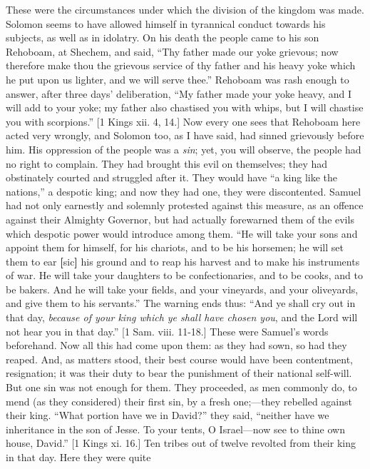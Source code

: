 These were the circumstances under which the division of the
kingdom was made. Solomon seems to have allowed himself in tyrannical
conduct towards his subjects, as well as in idolatry. On his death the
people came to his son Rehoboam, at Shechem, and said, ``Thy
father made our yoke grievous; now therefore make thou the grievous
service of thy father and his heavy yoke which he put upon us lighter,
and we will serve thee.'' Rehoboam was rash enough to answer,
after three days' deliberation, ``My father made your yoke
heavy, and I will add to your yoke; my father also chastised you with
whips, but I will chastise you with scorpions.'' [1 Kings xii. 4,
14.] Now every one sees that Rehoboam here acted very wrongly, and
Solomon too, as I have said, had sinned grievously before him. His
oppression of the people was a \emph{sin}; yet, you will observe, the
people had no right to complain. They had brought this evil on
themselves; they had obstinately courted and struggled after it. They
would have ``a king like the nations,'' a despotic king; and
now they had one, they were discontented. Samuel had not only
earnestly and solemnly protested against this measure, as an offence
against their Almighty Governor, but had actually forewarned them of
the evils which despotic power would introduce among them. ``He
will take your sons and appoint them for himself, for his chariots,
and to be his horsemen; he will set them to ear \textbf{[}sic\textbf{]}
his ground and to reap
his harvest and to make his instruments of war. He will take your
daughters to be confectionaries, and to be cooks, and to be bakers.
And he will take your fields, and your vineyards, and your oliveyards,
and give them to his servants.'' The warning ends thus: ``And
ye shall cry out in that day, \emph{because of your king which ye shall
have chosen you}, and the Lord will not hear you in that day.''
[1 Sam. viii. 11-18.] These were Samuel's words beforehand. Now all
this had come upon them: as they had sown, so had they reaped. And, as
matters stood, their best course would have been contentment,
resignation; it was their duty to bear the punishment of their
national self-will. But one sin was not enough for them. They
proceeded, as men commonly do, to mend (as they considered) their
first sin, by a fresh one;—they rebelled against their king.
``What portion have we in David?'' they said, ``neither
have we inheritance in the son of Jesse. To your tents, O Israel—now
see to thine own house, David.'' [1 Kings xi. 16.] Ten tribes out
of twelve revolted from their king in that day. Here they were quite
